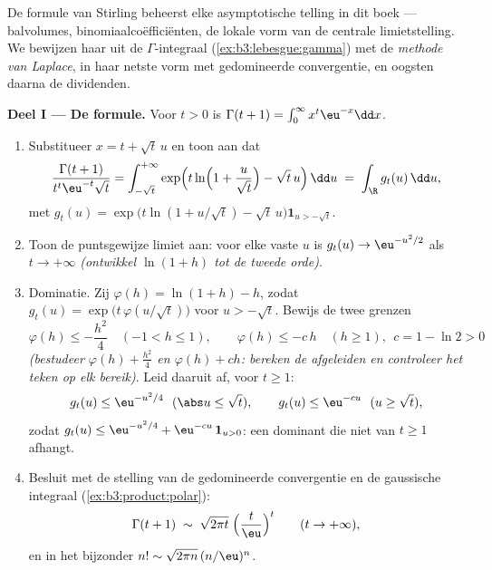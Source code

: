 \begin{problem}
\label{pb:b3:product:1}
De formule van Stirling beheerst elke asymptotische telling in dit
boek --- balvolumes, binomiaalcoëfficiënten, de lokale vorm van de
centrale limietstelling. We bewijzen haar uit de
$\Gamma$-integraal (\cref{ex:b3:lebesgue:gamma}) met de
\emph{methode van Laplace}, in haar netste vorm met gedomineerde
convergentie, en oogsten daarna de dividenden.

\medskip
\noindent\textbf{Deel I --- De formule.} Voor $t > 0$ is
$\Gamma(t + 1) = \int_0^\infty x^{t}\eu^{-x}\dd x$.
\begin{enumerate}
  \item Substitueer $x = t + \sqrt t\,u$ en toon aan dat
        \[
        \frac{\Gamma(t+1)}{t^{t}\eu^{-t}\sqrt t}
        = \int_{-\sqrt t}^{+\infty}
        \exp\Bigl(t\ln\Bigl(1 + \frac u{\sqrt
        t}\Bigr) - \sqrt t\,u\Bigr)\,\dd u
        \;=\;\int_\R g_t(u)\,\dd u,
        \]
        met $g_t(u) = \exp\bigl(t\ln(1 + u/\sqrt t) - \sqrt
        t\,u\bigr)\mathbf 1_{u > -\sqrt t}$.
  \item Toon de puntsgewijze limiet aan: voor elke vaste $u$ is
        $g_t(u) \to \eu^{-u^2/2}$ als $t \to +\infty$
        \emph{(ontwikkel $\ln(1 + h)$ tot de tweede orde)}.
  \item Dominatie. Zij $\varphi(h) = \ln(1 + h) - h$, zodat
        $g_t(u) = \exp\bigl(t\,\varphi(u/\sqrt t)\bigr)$ voor $u >
        -\sqrt t$. Bewijs de twee grenzen
        \[
        \varphi(h) \leq -\frac{h^2}4 \quad (-1 < h \leq 1),
        \qquad
        \varphi(h) \leq -c\,h \quad (h \geq 1),\ \ c = 1 -
        \ln 2 > 0
        \]
        \emph{(bestudeer $\varphi(h) + \frac{h^2}4$ en $\varphi(h)
        + ch$: bereken de afgeleiden en controleer het teken op
        elk bereik)}. Leid daaruit af, voor $t \geq 1$:
        \[
        g_t(u) \leq \eu^{-u^2/4}\ \ (\abs u \leq \sqrt t),
        \qquad
        g_t(u) \leq \eu^{-cu}\ \ (u \geq \sqrt t),
        \]
        zodat $g_t(u) \leq \eu^{-u^2/4} + \eu^{-cu}\,\mathbf 1_{u
        > 0}$: een  dominant die niet van $t \geq 1$
        afhangt.
  \item Besluit met de stelling van de gedomineerde convergentie
        en de gaussische integraal (\cref{ex:b3:product:polar}):
        \[
        \Gamma(t + 1) \;\sim\;
        \sqrt{2\pi t}\;\Bigl(\frac t\eu\Bigr)^{t}
        \qquad (t \to +\infty),
        \]
        en in het bijzonder $n! \sim \sqrt{2\pi n}\,(n/\eu)^n$.
\end{enumerate}


\end{problem}
